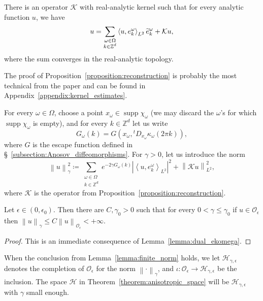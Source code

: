 \documentclass[AHL,Unicode,longabstracts,published]{cedram}
\DeclareMathOperator{\supp}{supp}
\newcommand{\n}[1]{\left\|#1\right\|}
\newcommand{\va}[1]{\left|#1\right|}
\newcommand{\clO}{\mathcal{O}}
\newcommand{\clH}{\mathcal{H}}
\newcommand{\clK}{\mathcal{K}}
\newcommand{\bbZ}{\mathbb{Z}}
\let\oldtilde\tilde
\renewcommand*{\tilde}[1]{\mathchoice{\widetilde{#1}}{\widetilde{#1}}{\oldtilde{#1}}{\oldtilde{#1}}}
\newcommand{\clO}{\mathcal{O}}
\begin{document}
\begin{prop}\label{proposition:reconstruction}
There is an operator $\clK $ with real-analytic kernel such that for every analytic function $u$, we have
\begin{equation}\label{eq:series}
u = \sum_{\substack{\omega \in \Omega\\
k \in \bbZ^d}} \left\langle u, e_k^\omega\right\rangle_{L^2} \tilde{e}_k^\omega + \clK u,
\end{equation}
where the sum converges in the real-analytic topology.
\end{prop}

The proof of Proposition~\ref{proposition:reconstruction} is probably the most technical from the paper and can be found in Appendix~\ref{appendix:kernel_estimates}.

For every $\omega \in \Omega$, choose a point $x_\omega \in \supp \chi_\omega$ (we may discard the $\omega$'s for which $\supp \chi_\omega$ is empty), and for every $k \in \bbZ^d$ let us write
\begin{equation*}
G_\omega(k) = G(x_\omega, {}^t D_{x_\omega} \kappa_\omega (2 \pi k)),
\end{equation*}
where $G$ is the escape function defined in \S~\ref{subsection:Anosov_diffeomorphisms}. For $\gamma > 0$, let us introduce the norm
\begin{equation*}
\n{u}_\gamma^2 \coloneqq \sum_{\substack{\omega \in \Omega \\
k \in \bbZ^d}} e^{-2 \gamma G_\omega(k)} \va{\left\langle u, e_k^\omega \right\rangle_{L^2}}^2 + \n{\clK u}_{L^2}^2,
\end{equation*}
where $\clK $ is the operator from Proposition~\ref{proposition:reconstruction}.

\begin{lemm}\label{lemma:finite_norm}
Let $\epsilon \in (0,\epsilon_0)$. Then there are $C,\gamma_0 >0$ such that for every $0 < \gamma \leq \gamma_0$ if $u \in \clO_\epsilon$ then $\n{u}_\gamma \leq C \n{u}_{\clO_\epsilon} < + \infty$.
\end{lemm}

\begin{proof}
This is an immediate consequence of Lemma~\ref{lemma:dual_ekomega}.
\end{proof}

When the conclusion from Lemma~\ref{lemma:finite_norm} holds, we let $\clH_{\gamma,\epsilon}$ denotes the completion of $\clO_\epsilon$ for the norm $\n{\cdot}_\gamma$, and $\iota : \clO_\epsilon \to \clH_{\gamma,\epsilon}$ be the inclusion. The space $\clH$ in Theorem~\ref{theorem:anisotropic_space} will be $\clH_{\gamma,\epsilon}$ with $\gamma$ small enough.
\end{document}
